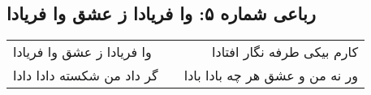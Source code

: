 \begin{center}
\section*{رباعی شماره ۵: وا فریادا ز عشق وا فریادا}
\label{sec:sh005}
\begin{longtable}{l p{0.5cm} r}
وا فریادا ز عشق وا فریادا
&&
کارم بیکی طرفه نگار افتادا
\\
گر داد من شکسته دادا دادا
&&
ور نه من و عشق هر چه بادا بادا
\\
\end{longtable}
\end{center}
